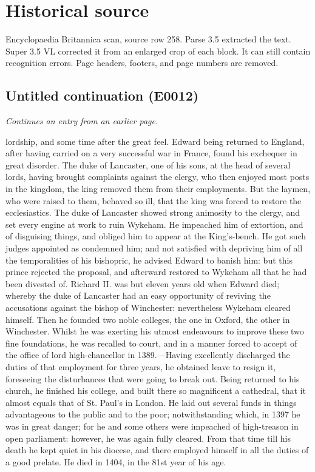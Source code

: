 \documentclass{article}
\begin{document}
\section*{Historical source}
Encyclopaedia Britannica scan, source row 258. Parse 3.5 extracted the text. Super 3.5 VL corrected it from an enlarged crop of each block. It can still contain recognition errors.
Page headers, footers, and page numbers are removed.

\subsection*{Untitled continuation (E0012)}
\textit{Continues an entry from an earlier page.}

lordship, and some time after the great feel. Edward being returned to England, after having carried on a very successful war in France, found his exchequer in great disorder. The duke of Lancaster, one of his sons, at the head of several lords, having brought complaints against the clergy, who then enjoyed most posts in the kingdom, the king removed them from their employments. But the laymen, who were raised to them, behaved so ill, that the king was forced to restore the ecclesiastics. The duke of Lancaster showed strong animosity to the clergy, and set every engine at work to ruin Wykeham. He impeached him of extortion, and of disguising things, and obliged him to appear at the King's-bench. He got such judges appointed as condemned him; and not satisfied with depriving him of all the temporalities of his bishopric, he advised Edward to banish him: but this prince rejected the proposal, and afterward restored to Wykeham all that he had been divested of. Richard II. was but eleven years old when Edward died; whereby the duke of Lancaster had an easy opportunity of reviving the accusations against the bishop of Winchester: nevertheless Wykeham cleared himself. Then he founded two noble colleges, the one in Oxford, the other in Winchester. Whilst he was exerting his utmost endeavours to improve these two fine foundations, he was recalled to court, and in a manner forced to accept of the office of lord high-chancellor in 1389.—Having excellently discharged the duties of that employment for three years, he obtained leave to resign it, foreseeing the disturbances that were going to break out. Being returned to his church, he finished his college, and built there so magnificent a cathedral, that it almost equals that of St. Paul's in London. He laid out several funds in things advantageous to the public and to the poor; notwithstanding which, in 1397 he was in great danger; for he and some others were impeached of high-treason in open parliament: however, he was again fully cleared. From that time till his death he kept quiet in his diocese, and there employed himself in all the duties of a good prelate. He died in 1404, in the 81st year of his age.
\end{document}
